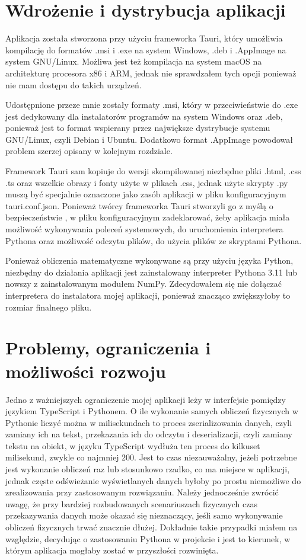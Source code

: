 \documentclass{SGGW-thesis}
\begin{document}
	
	\section{Wdrożenie i dystrybucja aplikacji}
	Aplikacja została stworzona przy użyciu frameworka Tauri, który umożliwia kompilację do formatów .msi i .exe na system Windows, .deb i .AppImage na system GNU/Linux. Możliwa jest też kompilacja na system macOS na architekturę procesora x86 i ARM, jednak nie sprawdzałem tych opcji ponieważ nie mam dostępu do takich urządzeń.
	
	Udostępnione przeze mnie zostały formaty .msi, który w przeciwieństwie do .exe jest dedykowany dla instalatorów programów na system Windows oraz .deb, ponieważ jest to format wspierany przez największe dystrybucje systemu GNU/Linux, czyli Debian i Ubuntu. Dodatkowo format .AppImage powodował problem szerzej opisany w kolejnym rozdziale. 
	
	Framework Tauri sam kopiuje do wersji skompilowanej niezbędne pliki .html, .css .ts oraz wszelkie obrazy i fonty użyte w plikach .css, jednak użyte skrypty .py muszą być specjalnie oznaczone jako zasób aplikacji w pliku konfiguracyjnym tauri.conf.json. Ponieważ twórcy frameworka Tauri stworzyli go z myślą o bezpieczeństwie \cite{about-tauri}, w pliku konfiguracyjnym zadeklarować, żeby aplikacja miała możliwość wykonywania poleceń systemowych, do uruchomienia interpretera Pythona oraz możliwość odczytu plików, do użycia plików ze skryptami Pythona.
	
	Ponieważ obliczenia matematyczne wykonywane są przy użyciu języka Python, niezbędny do działania aplikacji jest zainstalowany interpreter Pythona 3.11 lub nowszy z zainstalowanym modułem NumPy. Zdecydowałem się nie dołączać interpretera do instalatora mojej aplikacji, ponieważ znacząco zwiększyłoby to rozmiar finalnego pliku. 
	\section{Problemy, ograniczenia i możliwości rozwoju}
	Jedno z ważniejszych ograniczenie mojej aplikacji leży w interfejsie pomiędzy językiem TypeScript i Pythonem. O ile wykonanie samych obliczeń fizycznych w Pythonie liczyć można w milisekundach to proces zserializowania danych, czyli zamiany ich na tekst, przekazania ich do odczytu i deserializacji, czyli zamiany tekstu na obiekt, w języku TypeScript wydłuża ten proces do kilkuset milisekund, zwykle co najmniej 200. Jest to czas niezauważalny, jeżeli potrzebne jest wykonanie obliczeń raz lub stosunkowo rzadko, co ma miejsce w aplikacji, jednak częste odświeżanie wyświetlanych danych byłoby po prostu niemożliwe do zrealizowania przy zastosowanym rozwiązaniu. Należy jednocześnie zwrócić uwagę, że przy bardziej rozbudowanych scenariuszach fizycznych czas przekazywania danych może okazać się nieznaczący, jeśli samo wykonywanie obliczeń fizycznych trwać znacznie dłużej. Dokładnie takie przypadki miałem na względzie, decydując o zastosowaniu Pythona w projekcie i jest to kierunek, w którym aplikacja mogłaby zostać w przyszłości rozwinięta.
	
\end{document}
